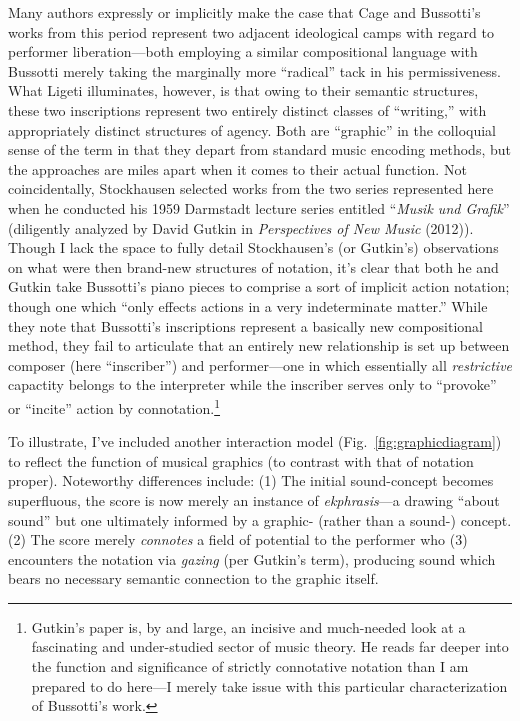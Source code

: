     Many authors expressly or implicitly make the case that Cage and Bussotti's works from this period represent two adjacent ideological camps with regard to performer liberation---both employing a similar compositional language with Bussotti merely taking the marginally more ``radical'' tack in his permissiveness. What Ligeti illuminates, however, is that owing to their semantic structures, these two inscriptions represent two entirely distinct classes of ``writing,'' with appropriately distinct structures of agency. Both are ``graphic'' in the colloquial sense of the term in that they depart from standard music encoding methods, but the approaches are miles apart when it comes to their actual function. Not coincidentally, Stockhausen selected works from the two series represented here when he conducted his 1959 Darmstadt lecture series entitled ``\textit{Musik und Grafik}'' (diligently analyzed by David Gutkin in \textit{Perspectives of New Music} (2012)). Though I lack the space to fully detail Stockhausen's (or Gutkin's) observations on what were then brand-new structures of notation, it's clear that both he and Gutkin take Bussotti's piano pieces to comprise a sort of implicit action notation; though one which ``only effects actions in a very indeterminate matter.''\autocite[276]{Gutkin} While they note that Bussotti's inscriptions represent a basically new compositional method, they fail to articulate that an entirely new relationship is set up between composer (here ``inscriber'') and performer---one in which essentially all \textit{restrictive} capactity belongs to the interpreter while the inscriber serves only to ``provoke'' or ``incite'' action by connotation.\footnote{Gutkin's paper is, by and large, an incisive and much-needed look at a fascinating and under-studied sector of music theory. He reads far deeper into the function and significance of strictly connotative notation than I am prepared to do here---I merely take issue with this particular characterization of Bussotti's work.} 
    
    To illustrate, I've included another interaction model (Fig.~\ref{fig:graphicdiagram}) to reflect the function of musical graphics (to contrast with that of notation proper). Noteworthy differences include: (1) The initial sound-concept becomes superfluous, the score is now merely an instance of \textit{ekphrasis}---a drawing ``about sound'' but one ultimately informed by a graphic- (rather than a sound-) concept. (2) The score merely \textit{connotes} a field of potential to the performer who (3) encounters the notation via \textit{gazing} (per Gutkin's term), producing sound which bears no necessary semantic connection to the graphic itself.

